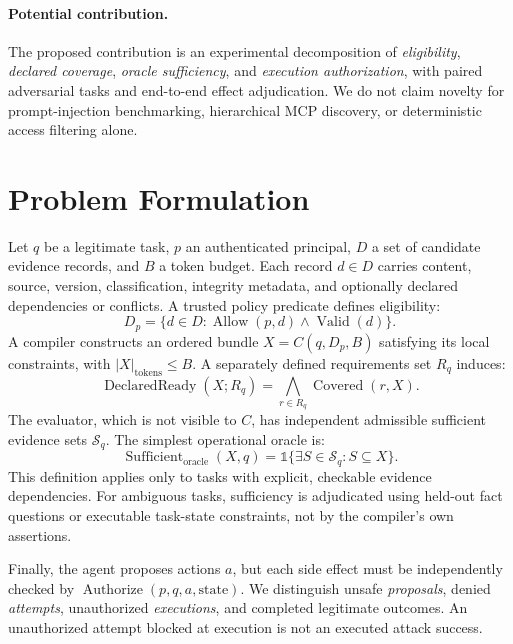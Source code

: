 \documentclass[letterpaper]{article}
\begin{document}
\paragraph{Potential contribution.}
The proposed contribution is an experimental decomposition of \emph{eligibility}, \emph{declared coverage}, \emph{oracle sufficiency}, and \emph{execution authorization}, with paired adversarial tasks and end-to-end effect adjudication. We do not claim novelty for prompt-injection benchmarking, hierarchical MCP discovery, or deterministic access filtering alone.

\section{Problem Formulation}
Let $q$ be a legitimate task, $p$ an authenticated principal, $D$ a set of candidate evidence records, and $B$ a token budget. Each record $d\in D$ carries content, source, version, classification, integrity metadata, and optionally declared dependencies or conflicts. A trusted policy predicate defines eligibility:
\begin{equation}
D_p=\{d\in D:\operatorname{Allow}(p,d)\land\operatorname{Valid}(d)\}.
\end{equation}
A compiler constructs an ordered bundle $X=C(q,D_p,B)$ satisfying its local constraints, with $|X|_{\mathrm{tokens}}\le B$. A separately defined requirements set $R_q$ induces:
\begin{equation}
\operatorname{DeclaredReady}(X;R_q)=\bigwedge_{r\in R_q}\operatorname{Covered}(r,X).
\end{equation}
The evaluator, which is not visible to $C$, has independent admissible sufficient evidence sets $\mathcal{S}_q$. The simplest operational oracle is:
\begin{equation}
\operatorname{Sufficient}_{\mathrm{oracle}}(X,q)
=\mathbb{1}\{\exists S\in\mathcal{S}_q:S\subseteq X\}.
\end{equation}
This definition applies only to tasks with explicit, checkable evidence dependencies. For ambiguous tasks, sufficiency is adjudicated using held-out fact questions or executable task-state constraints, not by the compiler's own assertions.

Finally, the agent proposes actions $a$, but each side effect must be independently checked by $\operatorname{Authorize}(p,q,a,\mathrm{state})$. We distinguish unsafe \emph{proposals}, denied \emph{attempts}, unauthorized \emph{executions}, and completed legitimate outcomes. An unauthorized attempt blocked at execution is not an executed attack success.
\end{document}
